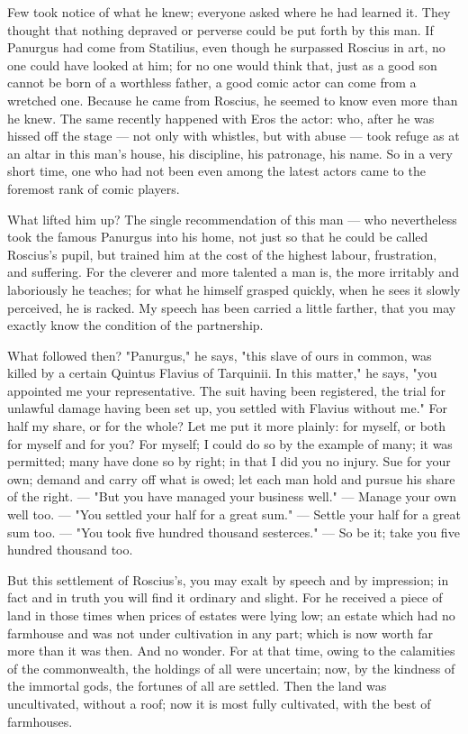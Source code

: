  Few took notice of what he knew; everyone asked where he had learned it. They thought that nothing depraved or perverse could be put forth by this man. If Panurgus had come from Statilius, even though he surpassed Roscius in art, no one could have looked at him; for no one would think that, just as a good son cannot be born of a worthless father, a good comic actor can come from a wretched one. Because he came from Roscius, he seemed to know even more than he knew. The same recently happened with Eros the actor: who, after he was hissed off the stage --- not only with whistles, but with abuse --- took refuge as at an altar in this man's house, his discipline, his patronage, his name. So in a very short time, one who had not been even among the latest actors came to the foremost rank of comic players.

 What lifted him up? The single recommendation of this man --- who nevertheless took the famous Panurgus into his home, not just so that he could be called Roscius's pupil, but trained him at the cost of the highest labour, frustration, and suffering. For the cleverer and more talented a man is, the more irritably and laboriously he teaches; for what he himself grasped quickly, when he sees it slowly perceived, he is racked. My speech has been carried a little farther, that you may exactly know the condition of the partnership.

 What followed then? "Panurgus," he says, "this slave of ours in common, was killed by a certain Quintus Flavius of Tarquinii. In this matter," he says, "you appointed me your representative. The suit having been registered, the trial for unlawful damage having been set up, you settled with Flavius without me." For half my share, or for the whole? Let me put it more plainly: for myself, or both for myself and for you? For myself; I could do so by the example of many; it was permitted; many have done so by right; in that I did you no injury. Sue for your own; demand and carry off what is owed; let each man hold and pursue his share of the right. --- "But you have managed your business well." --- Manage your own well too. --- "You settled your half for a great sum." --- Settle your half for a great sum too. --- "You took five hundred thousand sesterces." --- So be it; take you five hundred thousand too.

 But this settlement of Roscius's, you may exalt by speech and by impression; in fact and in truth you will find it ordinary and slight. For he received a piece of land in those times when prices of estates were lying low; an estate which had no farmhouse and was not under cultivation in any part; which is now worth far more than it was then. And no wonder. For at that time, owing to the calamities of the commonwealth, the holdings of all were uncertain; now, by the kindness of the immortal gods, the fortunes of all are settled. Then the land was uncultivated, without a roof; now it is most fully cultivated, with the best of farmhouses.

